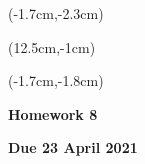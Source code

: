 \documentclass[12pt, oneside]{article}
\begin{document}
\begin{textblock*}{4cm}(-1.7cm,-2.3cm)
\end{textblock*}

\begin{textblock*}{8cm}(12.5cm,-1cm)
\end{textblock*}
\begin{textblock*}{13.5cm}(-1.7cm,-1.8cm)
\end{textblock*}

\vspace{1cm}

\begin{center}
\textbf{\Large Homework 8}

\textbf{Due 23 April 2021}
\end{center}
\end{document}
